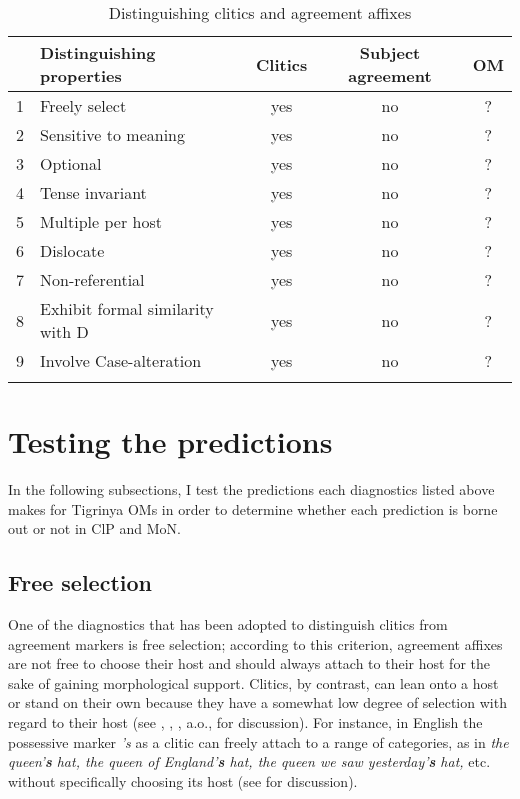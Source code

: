 \documentclass[output=paper]{langscibook}
\begin{document}
\begin{table}
\caption{Distinguishing clitics and agreement affixes\label{tab:Gebregziabher:Table1}}
\begin{tabular}{llccc}
\lsptoprule
&Distinguishing properties & Clitics & Subject agreement &OM\\\midrule
1 & Freely select & yes & no & ? \\ 
2 & Sensitive to meaning &yes & no &? \\ 
3 & Optional & yes & no &? \\ 
4 &Tense invariant &yes & no &? \\  
5 &Multiple per host &yes &no &? \\  
6 &Dislocate &yes &no &? \\  
7 &Non-referential &yes &no &? \\  
8 &Exhibit formal similarity with D &yes &no &? \\  
9 &Involve Case-alteration &yes &no &? \\ 
\lspbottomrule 
\end{tabular}
\end{table}


\section{Testing the predictions}\label{sec:gebregziabher:3}
In the following subsections, I test the predictions each diagnostics listed above makes for Tigrinya OMs in order to determine whether each prediction is borne out or not in ClP and MoN.

\subsection{Free selection}
One of the diagnostics that has been adopted to distinguish clitics from agreement markers is free selection; according to this criterion, agreement affixes are not free to choose their host and should always attach to their host for the sake of gaining morphological support. Clitics, by contrast, can lean onto a host or stand on their own because they have a somewhat low degree of selection with regard to their host (see \citealt{zwickyandpullum}, \citealt{anderson05}, \citealt{spencerandluis}, a.o., for discussion). For instance, in English the possessive marker \emph{'s} as a clitic can freely attach to a range of categories, as in \emph{the queen'{\textbf{s}} hat, the queen of England'{\textbf{s}} hat, the queen we saw yesterday'{\textbf{s}} hat,} etc. without specifically choosing its host (see \citealt{spencerandluis} for discussion).
\end{document}
